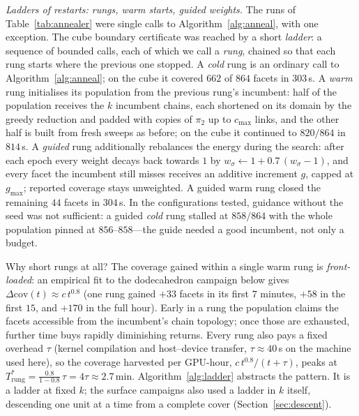 \documentclass[12pt]{article}
\begin{document}
\emph{Ladders of restarts: rungs, warm starts, guided weights.}  The
runs of Table~\ref{tab:annealer} were single calls to
Algorithm~\ref{alg:anneal}, with one exception.  The cube boundary
certificate was reached by a short \emph{ladder}: a sequence of bounded
calls, each of which we call a \emph{rung}, chained so that each rung
starts where the previous one stopped.  A \emph{cold} rung is an
ordinary call to Algorithm~\ref{alg:anneal}; on the cube it covered
$662$ of $864$ facets in $303$\,s.  A \emph{warm} rung initialises its
population from the previous rung's incumbent: half of the population
receives the $k$ incumbent chains, each shortened on its domain by the
greedy reduction and padded with copies of $\pi_2$ up to $c_{\max}$
links, and the other half is built from fresh sweeps as before; on the
cube it continued to $820/864$ in $814$\,s.  A \emph{guided} rung
additionally rebalances the energy during the search: after each epoch
every weight decays back towards $1$ by $w_\sigma\gets
1+0.7\,(w_\sigma-1)$, and every facet the incumbent still misses
receives an additive increment $g$, capped at $g_{\max}$; reported
coverage stays unweighted.  A guided warm rung closed the remaining
$44$ facets in $304$\,s.  In the configurations tested, guidance without the seed was not
sufficient: a guided \emph{cold} rung stalled at $858/864$ with the
whole population pinned at $856$--$858$---the guide needed a good
incumbent, not only a budget.

Why short rungs at all?  The coverage gained within a single warm rung
is \emph{front-loaded}: an empirical fit to the dodecahedron campaign
below gives $\Delta\mathrm{cov}(t)\approx c\,t^{0.8}$ (one
rung gained $+33$ facets in its first $7$ minutes, $+58$ in the first
$15$, and $+170$ in the full hour).  Early in a rung the population
claims the facets accessible from the incumbent's chain topology; once
those are exhausted, further time buys rapidly diminishing returns.
Every rung also pays a fixed overhead $\tau$ (kernel compilation and
host--device transfer, $\tau\approx40$\,s on the machine used here), so
the coverage harvested per GPU-hour, $c\,t^{0.8}/(t+\tau)$, peaks at
$T^{*}_{\mathrm{rung}}=\tfrac{0.8}{1-0.8}\,\tau=4\tau\approx2.7$\,min.
Algorithm~\ref{alg:ladder} abstracts the pattern.  It is a ladder at
fixed $k$; the surface campaigns also used a ladder in $k$ itself,
descending one unit at a time from a complete cover (Section~\ref{sec:descent}).
\end{document}
